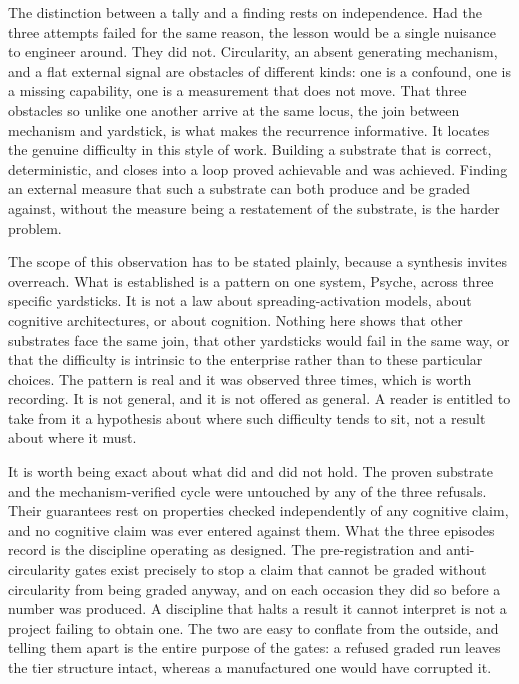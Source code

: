 \documentclass[11pt]{article}
\begin{document}
The distinction between a tally and a finding rests on independence. Had the three
attempts failed for the same reason, the lesson would be a single nuisance to engineer
around. They did not. Circularity, an absent generating mechanism, and a flat external
signal are obstacles of different kinds: one is a confound, one is a missing capability,
one is a measurement that does not move. That three obstacles so unlike one another arrive
at the same locus, the join between mechanism and yardstick, is what makes the recurrence
informative. It locates the genuine difficulty in this style of work. Building a substrate
that is correct, deterministic, and closes into a loop proved achievable and was achieved.
Finding an external measure that such a substrate can both produce and be graded against,
without the measure being a restatement of the substrate, is the harder problem.

The scope of this observation has to be stated plainly, because a synthesis invites
overreach. What is established is a pattern on one system, Psyche, across three specific
yardsticks. It is not a law about spreading-activation models, about cognitive
architectures, or about cognition. Nothing here shows that other substrates face the same
join, that other yardsticks would fail in the same way, or that the difficulty is
intrinsic to the enterprise rather than to these particular choices. The pattern is real
and it was observed three times, which is worth recording. It is not general, and it is
not offered as general. A reader is entitled to take from it a hypothesis about where such
difficulty tends to sit, not a result about where it must.

It is worth being exact about what did and did not hold. The proven substrate and the
mechanism-verified cycle were untouched by any of the three refusals. Their guarantees
rest on properties checked independently of any cognitive claim, and no cognitive claim
was ever entered against them. What the three episodes record is the discipline operating
as designed. The pre-registration and anti-circularity gates exist precisely to stop a
claim that cannot be graded without circularity from being graded anyway, and on each
occasion they did so before a number was produced. A discipline that halts a result it
cannot interpret is not a project failing to obtain one. The two are easy to conflate from
the outside, and telling them apart is the entire purpose of the gates: a refused graded
run leaves the tier structure intact, whereas a manufactured one would have corrupted it.
\end{document}
